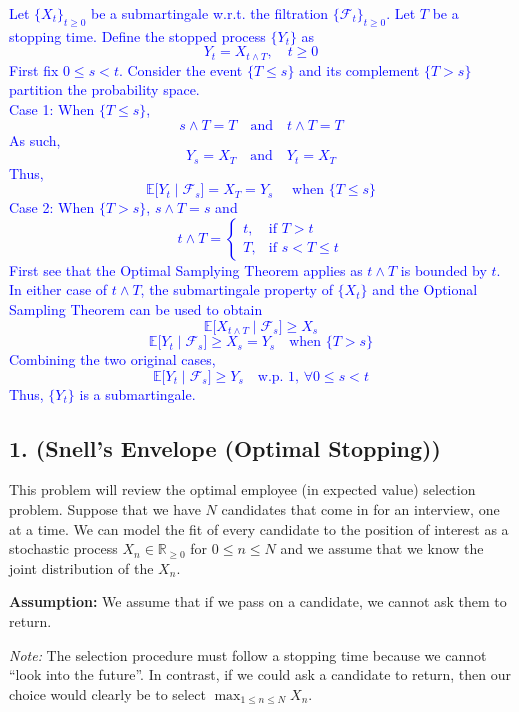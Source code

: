 \documentclass{article}
\begin{document}
\textcolor{blue}{
    Let $\{X_t\}_{t\ge 0}$ be a submartingale w.r.t. the filtration $\{\mathcal{F}_t\}_{t\ge 0}$. Let $T$ be a stopping time. Define the stopped process $\{Y_t\}$ as
\[
Y_t = X_{t\wedge T}, \quad t\ge 0
\]
First fix $0\le s < t$. Consider the event $\{T \le s\}$ and its complement $\{T > s\}$ partition the probability space. \\ 
Case 1: When $\{T\le s\}$,
\[
s\wedge T = T \quad \text{and} \quad t\wedge T = T
\]
As such,
\[
Y_s = X_T \quad \text{and} \quad Y_t = X_T
\]
Thus,
\[
    \mathbb{E}\bigl[Y_t \mid \mathcal{F}_s\bigr] = X_T = Y_s \quad \text{ when } \{T\le s\}
\]
Case 2: When $\{T > s\}$, $s\wedge T = s$ and
\[
t\wedge T =
\begin{cases}
t, & \text{if } T > t \\
T, & \text{if } s < T \le t
\end{cases}
\]
First see that the Optimal Samplying Theorem applies as $t\wedge T$ is bounded by $t$. \\
In either case of $t \wedge T$, the submartingale property of $\{X_t\}$ and the Optional Sampling Theorem can be used to obtain
\[
\mathbb{E}\bigl[X_{t\wedge T}\mid\mathcal{F}_s\bigr] \ge X_s
\]
\[
\mathbb{E}\bigl[Y_t\mid\mathcal{F}_s\bigr] \ge X_s = Y_s \quad \text{when } \{T > s\}
\]
Combining the two original cases,
\[
\mathbb{E}\bigl[Y_t\mid\mathcal{F}_s\bigr] \ge Y_s \quad \text{w.p. 1, } \forall 0\le s < t
\]
Thus, $\{Y_t\}$ is a submartingale.
}

\subsection*{1. (Snell’s Envelope (Optimal Stopping))}

This problem will review the optimal employee (in expected value) selection problem. Suppose that we have $N$ candidates that come in for an interview, one at a time. We can model the fit of every candidate to the position of interest as a stochastic process $X_n \in \mathbb{R}_{\geq 0}$ for $0 \leq n \leq N$ and we assume that we know the joint distribution of the $X_n$.

\textbf{Assumption:} We assume that if we pass on a candidate, we cannot ask them to return.

\textit{Note:} The selection procedure must follow a stopping time because we cannot ``look into the future''. In contrast, if we could ask a candidate to return, then our choice would clearly be to select $\max_{1 \leq n \leq N} X_n$.
\end{document}
